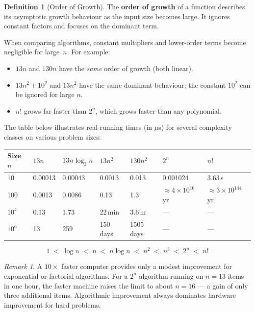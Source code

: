 \documentclass[11pt, a4paper, notitlepage]{report}
\theoremstyle{definition}
\newtheorem{definition}[theorem]{Definition}
\theoremstyle{remark}
\newtheorem{remark}[theorem]{Remark}
\theoremstyle{definition}
\begin{document}
\begin{definition}[Order of Growth]
\label{def:order-of-growth}
The \textbf{order of growth} of a function describes its asymptotic growth
behaviour as the input size becomes large.  It ignores constant factors and
focuses on the dominant term.
\end{definition}

When comparing algorithms, constant multipliers and lower-order terms become
negligible for large~$n$.  For example:
\begin{itemize}
  \item $13n$ and $130n$ have the \emph{same} order of growth (both linear).
  \item $13n^2 + 10^2$ and $13n^2$ have the same dominant behaviour; the
        constant $10^2$ can be ignored for large $n$.
  \item $n!$ grows far faster than $2^n$, which grows faster than any polynomial.
\end{itemize}

The table below illustrates real running times (in $\mu$s) for several complexity
classes on various problem sizes:

\begin{center}
\begin{tabularx}{\linewidth}{@{}lXXXXXX@{}}
\toprule
\textbf{Size $n$} & $13n$ & $13n\log_2 n$ & $13n^2$ & $130n^2$ & $2^n$ & $n!$ \\
\midrule
10     & 0.00013 & 0.00043 & 0.0013   & 0.013    & 0.001024   & 3.63\,s \\
100    & 0.0013  & 0.0086  & 0.13     & 1.3      & $\approx4\times10^{16}$\,yr & $\approx3\times10^{144}$\,yr \\
$10^4$ & 0.13    & 1.73    & 22\,min  & 3.6\,hr  & ---        & --- \\
$10^6$ & 13      & 259     & 150\,days& 1505\,days& ---       & --- \\
\bottomrule
\end{tabularx}
\end{center}

\begin{keyresult}[title={Growth Rate Ordering (slowest to fastest)}]
\[
  1 \;<\; \log n \;<\; n \;<\; n\log n \;<\; n^2 \;<\; n^3 \;<\; 2^n \;<\; n!
\]
\end{keyresult}

\begin{remark}
A $10\times$ faster computer provides only a modest improvement for exponential
or factorial algorithms.  For a $2^n$ algorithm running on $n = 13$ items in one
hour, the faster machine raises the limit to about $n = 16$ --- a gain of only
three additional items.  Algorithmic improvement always dominates hardware
improvement for hard problems.
\end{remark}
\end{document}
